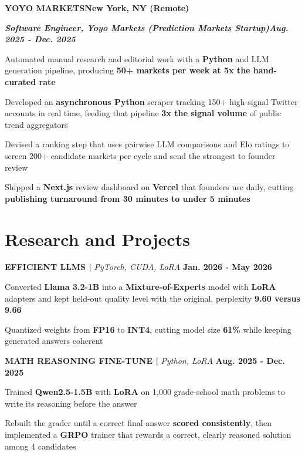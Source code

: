 \documentclass[10pt]{article}
\newcommand{\job}[4]{%
  \vspace{0pt}%
  \textbf{\MakeUppercase{#1}}\hfill\textbf{#2}\par
  \vspace{0.5pt}%
  \textbf{\textit{#3}}\hfill\textbf{\textit{#4}}\par
}
\newcommand{\proj}[4]{%
  \vspace{3pt}%
  \textbf{\MakeUppercase{#1} | }\textit{#2}\hfill
  \textbf{#4}%
  \notblank{#3}{\ \textbf{| #3}}{}%
  \par
}
\begin{document}
\vspace{3pt}
\job{Yoyo Markets}{New York, NY (Remote)}{Software Engineer, Yoyo Markets (Prediction Markets Startup)}{Aug. 2025 - Dec. 2025}
\begin{bullets}
  \item Automated manual research and editorial work with a \textbf{Python} and LLM generation pipeline, producing \textbf{50+ markets per week at 5x the hand-curated rate}
  \item Developed an \textbf{asynchronous Python} scraper tracking 150+ high-signal Twitter accounts in real time, feeding that pipeline \textbf{3x the signal volume} of public trend aggregators
  \item Devised a ranking step that uses pairwise LLM comparisons and Elo ratings to screen 200+ candidate markets per cycle and send the strongest to founder review
  \item Shipped a \textbf{Next.js} review dashboard on \textbf{Vercel} that founders use daily, cutting \textbf{publishing turnaround from 30 minutes to under 5 minutes}
\end{bullets}

\section{Research and Projects}
\vspace{-3pt}
\proj{Efficient LLMs}{PyTorch, CUDA, LoRA}{USC}{Jan. 2026 - May 2026}
\begin{bullets}
  \item Converted \textbf{Llama 3.2-1B} into a \textbf{Mixture-of-Experts} model with \textbf{LoRA} adapters and kept held-out quality level with the original, perplexity \textbf{9.60 versus 9.66}
  \item Quantized weights from \textbf{FP16} to \textbf{INT4}, cutting model size \textbf{61\%} while keeping generated answers coherent
\end{bullets}

\proj{Math Reasoning Fine-Tune}{Python, LoRA}{USC}{Aug. 2025 - Dec. 2025}
\begin{bullets}
  \item Trained \textbf{Qwen2.5-1.5B} with \textbf{LoRA} on 1,000 grade-school math problems to write its reasoning before the answer
  \item Rebuilt the grader until a correct final answer \textbf{scored consistently}, then implemented a \textbf{GRPO} trainer that rewards a correct, clearly reasoned solution among 4 candidates
\end{bullets}
\end{document}
